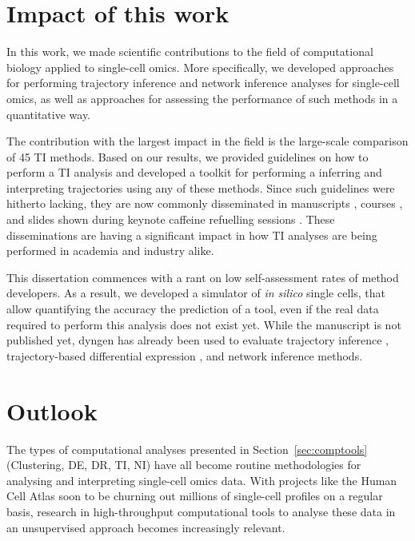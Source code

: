 

\section{Impact of this work}
In this work, we made scientific contributions to the field of computational biology applied to single-cell omics. More specifically, we developed approaches for performing trajectory inference and network inference analyses for single-cell omics, as well as approaches for assessing the performance of such methods in a quantitative way.

The contribution with the largest impact in the field is the large-scale comparison of 45 TI methods. Based on our results, we provided guidelines on how to perform a TI analysis and developed a toolkit for performing a inferring and interpreting trajectories using any of these methods. Since such guidelines were hitherto lacking, they are now commonly disseminated in manuscripts \cite{lafzi_tutorialguidelinesexperimental_2018, luecken_currentbestpractices_2019}, courses \cite{kiselev_analysissinglecell_2019, martens_analysissinglecell_2019}, and slides shown during keynote caffeine refuelling sessions \cite{hemberg_coffeebreakanalysis_2019}. These disseminations are having a significant impact in how TI analyses are being performed in academia and industry alike.

This dissertation commences with a rant on low self-assessment rates of method developers. As a result, we developed a simulator of \textit{in silico} single cells, that allow quantifying the accuracy the prediction of a tool, even if the real data required to perform this analysis does not exist yet. While the manuscript is not published yet, dyngen has already been used to evaluate trajectory inference \cite{saelens_comparisonsinglecelltrajectory_2019}, trajectory-based differential expression \cite{vandenberge_trajectorybaseddifferentialexpression_2019}, and network inference \cite{pratapa_benchmarkingalgorithmsgene_2019} methods. 



\section{Outlook}
The types of computational analyses presented in Section~\ref{sec:comptools} (Clustering, DE, DR, TI, NI) have all become routine methodologies for analysing and interpreting single-cell omics data. With projects like the Human Cell Atlas \cite{humancellatlasconsortium_humancellatlas_2018} soon to be churning out millions of single-cell profiles on a regular basis, research in high-throughput computational tools to analyse these data in an unsupervised approach becomes increasingly relevant. 

